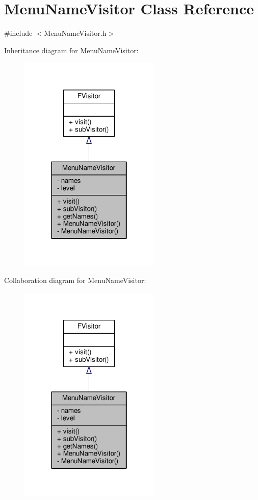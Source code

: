 \hypertarget{classMenuNameVisitor}{}\section{Menu\+Name\+Visitor Class Reference}
\label{classMenuNameVisitor}


{\ttfamily \#include $<$Menu\+Name\+Visitor.\+h$>$}



Inheritance diagram for Menu\+Name\+Visitor\+:
\nopagebreak
\begin{figure}[H]
\begin{center}
\leavevmode
\includegraphics[width=190pt]{classMenuNameVisitor__inherit__graph}
\end{center}
\end{figure}


Collaboration diagram for Menu\+Name\+Visitor\+:
\nopagebreak
\begin{figure}[H]
\begin{center}
\leavevmode
\includegraphics[width=190pt]{classMenuNameVisitor__coll__graph}
\end{center}
\end{figure}
